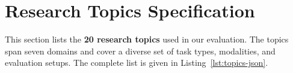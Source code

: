 \documentclass{opendatalab}
\begin{document}




\section{Research Topics Specification}
\label{app:topics}

This section lists the \textbf{20 research topics} used in our
evaluation. The topics span seven domains and cover a diverse set of
task types, modalities, and evaluation setups. The complete list is
given in Listing~\ref{lst:topics-json}.
\end{document}
